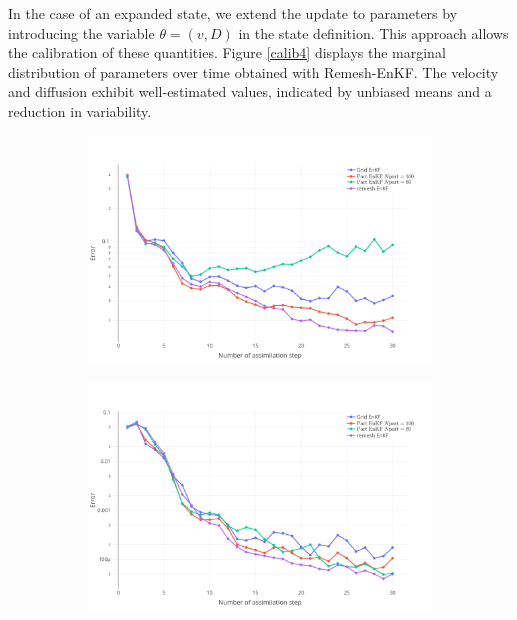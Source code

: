 In the case of an expanded state, we extend the update to parameters by introducing the variable $\theta = (v, D)$ in the state definition. This approach allows the calibration of these quantities.
Figure \ref{calib4} displays the marginal distribution of parameters over time obtained with Remesh-EnKF. The velocity and diffusion exhibit well-estimated values, indicated by unbiased means and a reduction in variability.

\begin{figure}[ht]
	\centering
	\begin{subfigure}{0.49\textwidth}
		\includegraphics[width=\textwidth]{images/app1d/w_calibration/state_error.png}
		\caption{}
		\label{calib1}
	\end{subfigure}
	\hfill
	\begin{subfigure}{0.49\textwidth}
		\includegraphics[width=\textwidth]{images/app1d/w_calibration/velocity_error.png}

\end{subfigure}
\end{figure}
